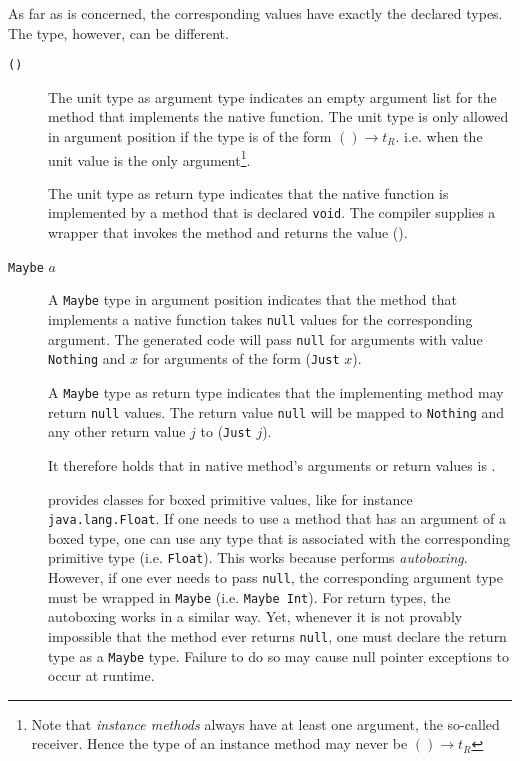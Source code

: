 As far as \frege{} is concerned, the corresponding values have exactly the declared types.
The \java{} type, however, can be different.

\begin{description}
\item[\texttt{()}] The unit type as argument type indicates an empty argument list for the \java{} method that implements the native function. The unit type is only allowed in argument position if the type is of the form $() \rightarrow t_R$. i.e. when the unit value is the only argument\footnote{Note that \emph{instance methods} always have at least one argument, the so-called receiver. Hence the \frege{} type of an instance method may never be $() \rightarrow t_R$}.

The unit type as return type indicates that the native function is implemented by a \java{} method that is declared \texttt{void}. The compiler supplies a wrapper that invokes the method and returns the value ().

\item[\texttt{Maybe} $a$] A \texttt{Maybe} type in argument position indicates that the \java{} method that implements a native function takes \texttt{null} values for the corresponding argument. The generated code will pass \texttt{null} for arguments with value \texttt{Nothing} and $x$ for arguments of the form (\texttt{Just} $x$).

A \texttt{Maybe} type as return type indicates that the implementing method may return \texttt{null} values. The return value \texttt{null} will be mapped to \texttt{Nothing} and any other return value $j$ to (\texttt{Just} $j$).

It therefore holds that  in native method's arguments or return values is .

\java{} provides classes for boxed primitive values, like for instance \texttt{java.lang.Float}. 
If one needs to use a method that has an argument of a boxed type, 
one can use any \frege{} type that is associated with the corresponding  primitive type (i.e. \texttt{Float}). 
This works because \java{} performs \emph{autoboxing}. 
However, if one ever needs to pass \texttt{null}, the corresponding argument type must be wrapped in \texttt{Maybe} (i.e. \texttt{Maybe Int}). 
For return types, the autoboxing works in a similar way. 
Yet, whenever it is not provably impossible that the method ever returns \texttt{null}, 
one must declare the return type as a \texttt{Maybe} type. 
Failure to do so may cause null pointer exceptions to occur at runtime.


\end{description}
